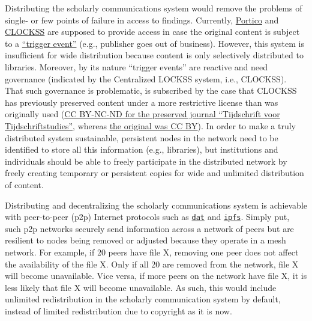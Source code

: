 \documentclass[]{tufte-book}
\begin{document}
Distributing the scholarly communications system would remove the
problems of single- or few points of failure in access to findings.
Currently, \href{http://www.portico.org/digital-preservation/}{Portico}
and \href{https://clockss.org/clockss/Home}{CLOCKSS} are supposed to
provide access in case the original content is subject to a
\href{https://clockss.org/clockss/FAQ\#How_does_the_CLOCKSS_board_define_a_trigger_event.3F}{``trigger
event''} (e.g., publisher goes out of business). However, this system is
insufficient for wide distribution because content is only selectively
distributed to libraries. Moreover, by its nature ``trigger events'' are
reactive and need governance (indicated by the Centralized LOCKSS
system, i.e., CLOCKSS). That such governance is problematic, is
subscribed by the case that CLOCKSS has previously preserved content
under a more restrictive license than was originally used
(\href{http://wayback.archive.org/web/20170518110938/https://clockss.org/clockss/Tijdschrift_voor_Tijdschriftstudies}{CC
BY-NC-ND for the preserved journal ``Tijdschrift voor
Tijdschriftstudies''}, whereas
\href{http://triggered.stanford.clockss.org/ServeContent?url=https\%3A\%2F\%2Fwww.tijdschriftstudies.nl\%2Farticles\%2F10.18352\%2Fts.340\%2Fprint\%2F}{the
original was CC BY}). In order to make a truly distributed system
sustainable, persistent nodes in the network need to be identified to
store all this information (e.g., libraries), but institutions and
individuals should be able to freely participate in the distributed
network by freely creating temporary or persistent copies for wide and
unlimited distribution of content.

Distributing and decentralizing the scholarly communications system is
achievable with peer-to-peer (p2p) Internet protocols such as
\href{https://datproject.org/}{\texttt{dat}} and
\href{https://ipfs.io/}{\texttt{ipfs}}. Simply put, such p2p networks
securely send information across a network of peers but are resilient to
nodes being removed or adjusted because they operate in a mesh network.
For example, if 20 peers have file X, removing one peer does not affect
the availability of the file X. Only if all 20 are removed from the
network, file X will become unavailable. Vice versa, if more peers on
the network have file X, it is less likely that file X will become
unavailable. As such, this would include unlimited redistribution in the
scholarly communication system by default, instead of limited
redistribution due to copyright as it is now.
\end{document}
